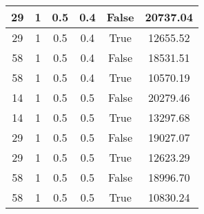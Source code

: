 \documentclass[12pt]{article}
\begin{document}
\begin{table}[h!]
\begin{tabular}{|c|c|c|c|c|c|}
29  &  1  &  0.5  &  0.4  &  False  &  20737.04\\ \hline
29  &  1  &  0.5  &  0.4  &  True  &  12655.52\\ \hline
58  &  1  &  0.5  &  0.4  &  False  &  18531.51\\ \hline
58  &  1  &  0.5  &  0.4  &  True  &  10570.19\\ \hline
14  &  1  &  0.5  &  0.5  &  False  &  20279.46\\ \hline
14  &  1  &  0.5  &  0.5  &  True  &  13297.68\\ \hline
29  &  1  &  0.5  &  0.5  &  False  &  19027.07\\ \hline
29  &  1  &  0.5  &  0.5  &  True  &  12623.29\\ \hline
58  &  1  &  0.5  &  0.5  &  False  &  18996.70\\ \hline
58  &  1  &  0.5  &  0.5  &  True  &  10830.24\\ \hline
\end{tabular}
\end{table}
\end{document}
